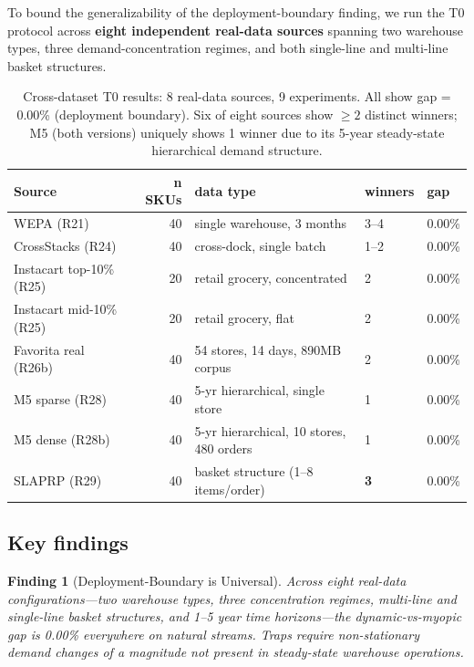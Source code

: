 \documentclass[11pt,a4paper]{article}
\newtheorem{finding}{Finding}
\begin{document}
To bound the generalizability of the deployment-boundary finding, we run
the T0 protocol across \textbf{eight independent real-data sources} spanning
two warehouse types, three demand-concentration regimes, and both single-line
and multi-line basket structures.

\begin{table}[h]
\centering
\small
\begin{tabular}{lrlll}
\toprule
Source & n SKUs & data type & winners & gap \\
\midrule
WEPA (R21) & 40 & single warehouse, 3 months & 3--4 & 0.00\% \\
CrossStacks (R24) & 40 & cross-dock, single batch & 1--2 & 0.00\% \\
Instacart top-10\% (R25) & 20 & retail grocery, concentrated & 2 & 0.00\% \\
Instacart mid-10\% (R25) & 20 & retail grocery, flat & 2 & 0.00\% \\
Favorita real (R26b) & 40 & 54 stores, 14 days, 890MB corpus & 2 & 0.00\% \\
M5 sparse (R28) & 40 & 5-yr hierarchical, single store & 1 & 0.00\% \\
M5 dense (R28b) & 40 & 5-yr hierarchical, 10 stores, 480 orders & 1 & 0.00\% \\
SLAPRP (R29) & 40 & basket structure (1--8 items/order) & \textbf{3} & 0.00\% \\
\bottomrule
\end{tabular}
\caption{Cross-dataset T0 results: 8 real-data sources, 9 experiments.
All show gap = 0.00\% (deployment boundary). Six of eight sources show
$\geq 2$ distinct winners; M5 (both versions) uniquely shows 1
winner due to its 5-year steady-state hierarchical demand structure.
\label{tab:cross-dataset}}
\end{table}

\subsection{Key findings}

\begin{finding}[Deployment-Boundary is Universal]
Across eight real-data configurations---two warehouse types, three
concentration regimes, multi-line and single-line basket structures, and
1--5 year time horizons---the dynamic-vs-myopic gap is 0.00\% everywhere
on natural streams. Traps require non-stationary demand changes of a
magnitude not present in steady-state warehouse operations.
\end{finding}
\end{document}

